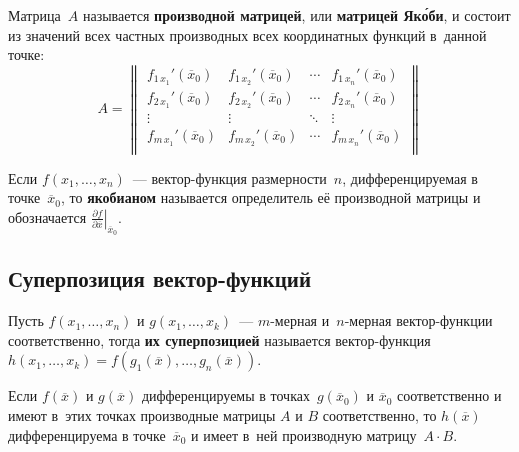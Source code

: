   Матрица~$A$ называется \textbf{производной матрицей}, или \textbf{матрицей Як\'{о}би}, и состоит из значений всех частных производных всех координатных функций в~данной точке:
\begin{equation*}
A =
\begin{Vmatrix}
f_{1\, x_1}'(\overline x_0) & f_{1\, x_2}'(\overline x_0) & \cdots & f_{1\, x_n}'(\overline x_0) \\
f_{2\, x_1}'(\overline x_0) & f_{2\, x_2}'(\overline x_0) & \cdots & f_{2\, x_n}'(\overline x_0) \\
\vdots & \vdots & \ddots & \vdots \\
f_{m\, x_1}'(\overline x_0) & f_{m\, x_2}'(\overline x_0) & \cdots & f_{m\, x_n}'(\overline x_0) \\
\end{Vmatrix}
\end{equation*}

 Если $f(x_1, \ldots, x_n)$~--- вектор-функция размерности~$n$, дифференцируемая в точке~$\overline x_0$, то \textbf{якобианом} называется определитель её производной матрицы и обозначается $\left. \frac{\partial f}{\partial \overline x} \right|_{\overline x_0}$.

\subsection{Суперпозиция вектор-функций}
Пусть $f(x_1, \ldots, x_n)$ и $g(x_1, \ldots, x_k)$~--- $m$-мерная и~$n$-мерная вектор-функции соответственно, тогда \textbf{их суперпозицией} называется вектор-функция~$h(x_1, \ldots, x_k) = f(g_1(\overline x), \ldots, g_n(\overline x))$.

\begin{theorem}
Если $f(\overline x)$ и $g(\overline x)$ дифференцируемы в точках~$g(\overline x_0)$ и $\overline x_0$ соответственно и имеют в~этих точках производные матрицы $A$ и $B$ соответственно, то $h(\overline x)$ дифференцируема в точке~$\overline x_0$ и имеет в~ней производную матрицу~$A \cdot B$.
\end{theorem}